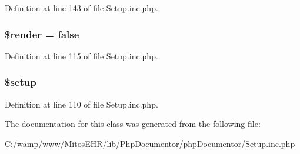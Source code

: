 \-Definition at line 143 of file \-Setup.\-inc.\-php.

\hypertarget{classphp_documentor__setup_a05fdc1afd38b444148d38a2738aada33}{
\subsubsection[{\$render}]{\setlength{\rightskip}{0pt plus 5cm}\$render = false}}\label{classphp_documentor__setup_a05fdc1afd38b444148d38a2738aada33}


\-Definition at line 115 of file \-Setup.\-inc.\-php.

\hypertarget{classphp_documentor__setup_af50a8fd8e98752ae9a55e4ac9b1be96e}{
\subsubsection[{\$setup}]{\setlength{\rightskip}{0pt plus 5cm}\$setup}}\label{classphp_documentor__setup_af50a8fd8e98752ae9a55e4ac9b1be96e}


\-Definition at line 110 of file \-Setup.\-inc.\-php.



\-The documentation for this class was generated from the following file\-:\begin{DoxyCompactItemize}
\item 
\-C\-:/wamp/www/\-Mitos\-E\-H\-R/lib/\-Php\-Documentor/php\-Documentor/\hyperlink{_setup_8inc_8php}{\-Setup.\-inc.\-php}\end{DoxyCompactItemize}
